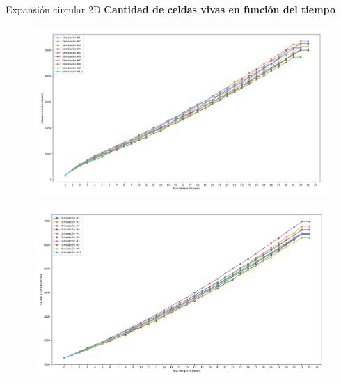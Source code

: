 \begin{frame}{Expansión circular 2D}
    \textbf{Cantidad de celdas vivas en función del tiempo}
    \begin{multicols}{2}
        {
            \begin{figure}[H]
                \centering
                \includegraphics[width=0.8\linewidth]{pic/circular2d/size_i10}
                \label{fig:expcirc:size:i10}
            \end{figure}
        }

        {
            \begin{figure}[H]
                \centering
                \includegraphics[width=0.8\linewidth]{pic/circular2d/size_i80}
                \label{fig:expcirc:size:i80}
            \end{figure}
        }
    \end{multicols}
\end{frame}


